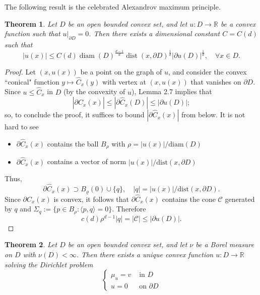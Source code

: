\documentclass[twoside, 12pt]{book}
\numberwithin{equation}{chapter}
\newtheorem{theorem}{Theorem}[section]
\def\cC{{\mathcal C}}
\def\mR{{\mathbb R}}
\def\<{\langle}
\def\>{\rangle}
\def\leq{\leqslant}
\def\p{\partial}
\def\dist{\mathrm{dist}}
\def\diam {\mathrm{diam}}
\begin{document}
	The following result is  the celebrated Alexandrov maximum principle.
	\begin{theorem}
		Let $D$ be  an open bounded convex set, and let $u: D\to \mR$ be a convex function such that $u|_{\p D}=0$. Then there exists a dimensional constant $C=C(d)$
		such that 
		\begin{equation}\label{eq:abp}
			|u(x)| \leq C(d) \operatorname{diam}(D)^{\frac{d-1}{d}} \operatorname{dist}(x, \partial D)^{\frac{1}{d}}|\partial u(D)|^{\frac{1}{d}},  \quad \forall x \in D. 
		\end{equation}
	\end{theorem}
	\begin{proof}
		Let $(x, u(x))$ be a point on the graph of $u$, and consider the convex ``conical" function $y\mapsto \widehat C_x(y)$ with vertex at $(x, u(x))$ that vanishes on $\p D$. 
		Since $u\leq \widehat C_x$ in $D$ (by the convexity of $u$), Lemma 2.7 implies that 
		$$
		\left|\partial \widehat{C}_x(x)\right| \leq\left|\partial \widehat{C}_x(D)\right| \leq|\partial u(D)| ;
		$$
		so, to conclude the proof, it suffices to bound $|\p \widehat C_x(x)|$ from below. It is not hard to see 
		\begin{itemize}
			\item $\p \widehat{C}_x(x)$ contains the ball $B_\rho$ with $\rho=|u(x)|/\diam (D)$
			\item $\p \widehat{C}_x(x)$ contains a vector of norm $|u(x)|/\dist (x, \p D)$
		\end{itemize}
		Thus, 
		$$
		\partial \widehat{C}_x(x) \supset B_{\varrho}(0) \cup\{q\}, \quad |q|=|u(x)|/\dist (x, \p D). 
		$$
		Since $\p \widehat{C}_x(x)$ is convex, it follows that $\p \widehat{C}_x(x)$ contains the cone $\cC$ generated
		by $q$ and $\Sigma_q:= \{p\in B_\rho: \<p,q\>=0\}$. Therefore 
		$$
		c(d) \rho^{d-1} |q| = |\cC| \leq |\p u(D)|. 
		$$
	\end{proof}
	
	\begin{theorem}
		Let $D$ be an open bounded convex set, and let $\nu$ be a Borel measure on $D$ with $\nu(D)<\infty$. Then there exists a unique convex function $u: D \rightarrow \mathbb{R}$ solving the Dirichlet problem
		$$
		\begin{cases}
			\mu_u=v & \text { in } D \\ u=0 & \text { on } \partial D
		\end{cases}
		$$
	\end{theorem}
	
\end{document}
